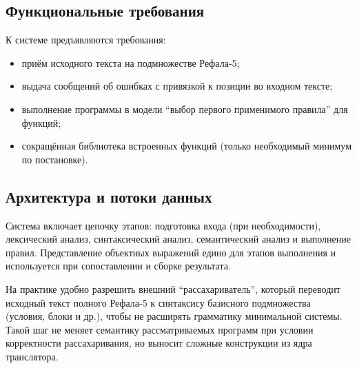 \documentclass[14pt, russian]{scrartcl}
\newcommand{\enq}[1]{\enquote{#1}}
\begin{document}
\subsection{Функциональные требования}

К системе предъявляются требования:
\begin{itemize}
  \item приём исходного текста на подмножестве Рефала-5;
  \item выдача сообщений об ошибках с привязкой к позиции во входном тексте;
  \item выполнение программы в модели \enq{выбор первого применимого правила} для функций;
  \item сокращённая библиотека встроенных функций (только необходимый минимум по постановке).
\end{itemize}

\subsection{Архитектура и потоки данных}

Система включает цепочку этапов: подготовка входа (при необходимости), лексический анализ, синтаксический анализ,
семантический анализ и выполнение правил. Представление объектных выражений едино для этапов выполнения и используется
при сопоставлении и сборке результата.

На практике удобно разрешить внешний \enq{рассахариватель}, который переводит исходный текст полного Рефала-5 к синтаксису
базисного подмножества (условия, блоки и др.), чтобы не расширять грамматику минимальной системы. Такой шаг не меняет
семантику рассматриваемых программ при условии корректности рассахаривания, но выносит сложные конструкции из ядра
транслятора.
\end{document}
